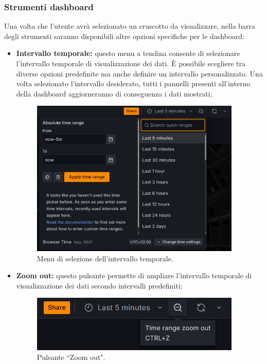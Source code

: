 \documentclass[8pt]{article}
\begin{document}
\subsubsection{Strumenti dashboard}
Una volta che l'utente avrà selezionato un cruscotto da visualizzare, nella barra degli strumenti saranno disponibili altre opzioni specifiche per le dashboard:
\begin{itemize}
    \item \textbf{Intervallo temporale:} questo menu a tendina consente di selezionare l'intervallo temporale di visualizzazione dei dati. È possibile scegliere tra diverse opzioni predefinite ma anche definire un intervallo personalizzato. Una volta selezionato l'intervallo desiderato, tutti i pannelli presenti all'interno della dashboard aggiorneranno di conseguenza i dati mostrati;
    \begin{figure}[H]
        \centering
        \includegraphics[width=10cm]{images_mu/interval.png}
        \caption{Menu di selezione dell'intervallo temporale.}
        \label{fig:Menu di selezione dell'intervallo temporale"}
    \end{figure}
    \item \textbf{Zoom out:} questo pulsante permette di ampliare l'intervallo temporale di visualizzazione dei dati secondo intervalli predefiniti;
    \begin{figure}[H]
        \centering
        \includegraphics[width=10cm]{images_mu/zoom.png}
        \caption{Pulsante ``Zoom out".}
        \label{fig:Pulsante ``Zoom out"}

\end{figure}
\end{itemize}
\end{document}
